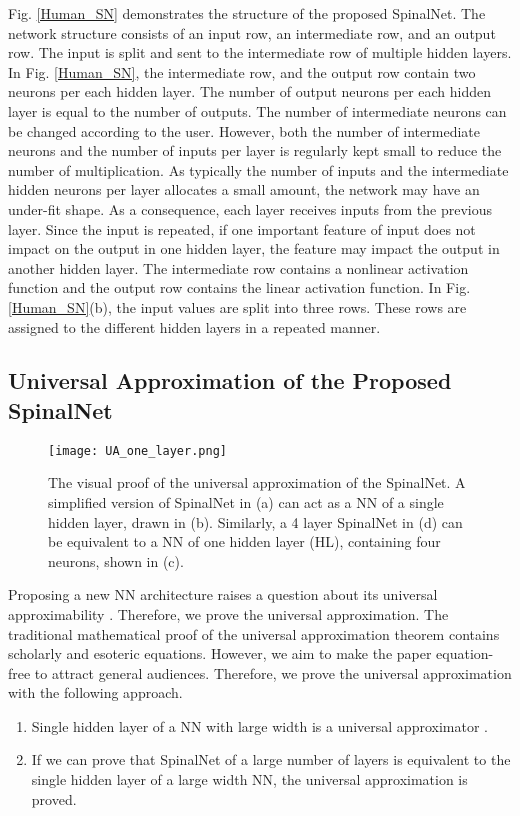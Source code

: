 \documentclass[journal]{IEEEtran}
\begin{document}
Fig. \ref{Human_SN} demonstrates the structure of the proposed SpinalNet. The network structure consists of an input row, an intermediate row, and an output row. The input is split and sent to the intermediate row of multiple hidden layers. In Fig. \ref{Human_SN}, the intermediate row, and the output row contain two neurons per each hidden layer. The number of output neurons per each hidden layer is equal to the number of outputs. The number of intermediate neurons can be changed according to the user. However, both the number of intermediate neurons and the number of inputs per layer is regularly kept small to reduce the number of multiplication. As typically the number of inputs and the intermediate hidden neurons per layer allocates a small amount, the network may have an under-fit shape. As a consequence, each layer receives inputs from the previous layer. Since the input is repeated, if one important feature of input does not impact on the output in one hidden layer, the feature may impact the output in another hidden layer. The intermediate row contains a nonlinear activation function and the output row contains the linear activation function. 
In Fig. \ref{Human_SN}(b), the input values are split into three rows. These rows are assigned to the different hidden layers in a repeated manner. 

\subsection{Universal Approximation of the Proposed SpinalNet}
\begin{figure}
  \centering
  \texttt{[image: UA\_one\_layer.png]}
  \caption{The visual proof of the universal approximation of the SpinalNet. A simplified version of SpinalNet in (a) can act as a NN of a single hidden layer, drawn in (b). Similarly, a 4 layer SpinalNet in (d) can be equivalent to a NN of one hidden layer (HL), containing four neurons, shown in (c). }
  \label{UApprox}
\end{figure}
Proposing a new NN architecture raises a question about its universal approximability \cite{lin2018resnet,fan2020universal}. Therefore, we prove the universal approximation. The traditional mathematical proof of the universal approximation theorem contains scholarly and esoteric equations. However, we aim to make the paper equation-free to attract general audiences. Therefore, we prove the universal approximation with the following approach.
\begin{enumerate}
  \item Single hidden layer of a NN with large width is a universal approximator \cite{csaji2001approximation}.
  \item If we can prove that SpinalNet of a large number of layers is equivalent to the single hidden layer of a large width NN, the universal approximation is proved.
\end{enumerate}  
\end{document}

